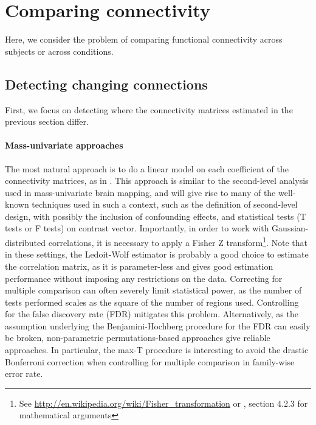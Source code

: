 \documentclass[5p]{elsarticle}
\begin{document}




\section{Comparing connectivity}

Here, we consider the problem of comparing functional connectivity across
subjects or across conditions.

\subsection{Detecting changing connections}

First, we focus on detecting where the connectivity matrices estimated in
the previous section differ. \paragraph{Mass-univariate approaches}
%
The most natural approach is to do a linear model on each coefficient of
the connectivity matrices, as in \cite{lewis2009,grillon2012}. This
approach is similar to the second-level analysis used in mass-univariate
brain mapping, and will give rise to many of the well-known techniques
used in such a context, such as the definition of second-level design,
with possibly the inclusion of confounding effects, and statistical tests
(T tests or F tests) on contrast vector. Importantly, in order to work
with Gaussian-distributed correlations, it is necessary to apply a Fisher
Z transform\footnote{See
\url{http://en.wikipedia.org/wiki/Fisher_transformation} or
\cite{anderson1958}, section 4.2.3 for mathematical arguments}. Note that
in these settings, the Ledoit-Wolf estimator \cite{ledoit2004} is
probably a good choice to estimate the correlation matrix, as it is
parameter-less and gives good estimation performance without imposing any
restrictions on the data.
%
Correcting for multiple comparison can often severely limit statistical
power, as the number of tests performed scales as the square of the
number of regions used. Controlling for the false discovery rate (FDR)
mitigates this problem. Alternatively, as the assumption underlying the
Benjamini-Hochberg procedure \cite{benjamini1995} for the FDR can easily
be broken, non-parametric permutations-based approaches give reliable
approaches. In particular, the max-T procedure \cite{ge2003,nichols2001}
is interesting to avoid the drastic Bonferroni correction when
controlling for multiple comparison in family-wise error rate.
\end{document}
